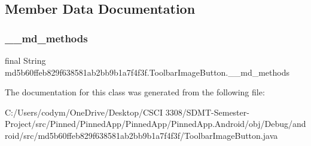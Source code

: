 \subsection{Member Data Documentation}
\mbox{\label{classmd5b60ffeb829f638581ab2bb9b1a7f4f3f_1_1_toolbar_image_button_a581edb38bbe374fe7d3ceed23ee694df}} 
\subsubsection{\texorpdfstring{\+\_\+\+\_\+md\+\_\+methods}{\_\_md\_methods}}
{\footnotesize\ttfamily final String md5b60ffeb829f638581ab2bb9b1a7f4f3f.\+Toolbar\+Image\+Button.\+\_\+\+\_\+md\+\_\+methods\hspace{0.3cm}{\ttfamily [static]}}



The documentation for this class was generated from the following file\+:\begin{DoxyCompactItemize}
\item 
C\+:/\+Users/codym/\+One\+Drive/\+Desktop/\+C\+S\+C\+I 3308/\+S\+D\+M\+T-\/\+Semester-\/\+Project/src/\+Pinned/\+Pinned\+App/\+Pinned\+App/\+Pinned\+App.\+Android/obj/\+Debug/android/src/md5b60ffeb829f638581ab2bb9b1a7f4f3f/Toolbar\+Image\+Button.\+java\end{DoxyCompactItemize}
